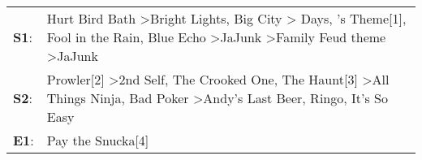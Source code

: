 \begin{supertabular}{p{0.03\textwidth}p{0.92\textwidth}}
 \textbf{S1}:  &  Hurt Bird Bath\textsuperscript{} \textgreater \enspace Bright Lights, Big City\textsuperscript{} \textgreater {} Days\textsuperscript{}, 's Theme[1]\textsuperscript{}, \enspace Fool in the Rain\textsuperscript{}, \enspace Blue Echo\textsuperscript{} \textgreater \enspace JaJunk\textsuperscript{} \textgreater \enspace Family Feud theme\textsuperscript{} \textgreater \enspace JaJunk\textsuperscript{}  \enspace  \\
 \textbf{S2}:  &                                  Prowler[2]\textsuperscript{} \textgreater \enspace 2nd Self\textsuperscript{}, \enspace The Crooked One\textsuperscript{}, \enspace The Haunt[3]\textsuperscript{} \textgreater \enspace All Things Ninja\textsuperscript{}, \enspace Bad Poker\textsuperscript{} \textgreater \enspace Andy's Last Beer\textsuperscript{}, \enspace Ringo\textsuperscript{}, \enspace It's So Easy\textsuperscript{}  \enspace  \\
 \textbf{E1}:  &                                                                                                                                                                                                                                                                                                                                                                                                    Pay the Snucka[4]\textsuperscript{}  \enspace  \\
\end{supertabular}
